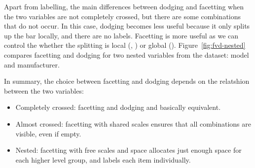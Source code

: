 % 


Apart from labelling, the main differences between dodging and facetting when the two variables are not completely crossed, but there are some combinations that do not occur.  In this case, dodging becomes less useful because it only splits up the bar locally, and there are no labels.  Facetting is more useful as we can control the whether the splitting is local (, ) or global ().  Figure~\ref{fig:fvd-nested} compares facetting and dodging for two nested variables from the  dataset: model and manufacturer.

In summary, the choice between facetting and dodging depends on the relatshion between the two variables:

\begin{itemize}
  \item Completely crossed: facetting and dodging and basically equivalent.

  \item Almost crossed: facetting with shared scales ensures that all combinations are visible, even if empty.

  \item Nested: facetting with free scales and space allocates just enough space for each higher level group, and labels each item individually.
\end{itemize}

% 


